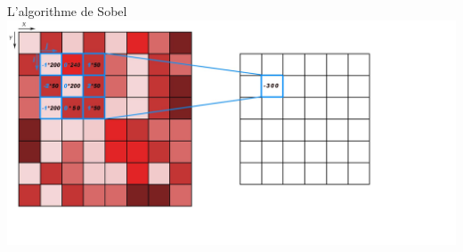 \documentclass[ignorenonframetext,]{beamer}
\begin{document}
\begin{frame}{L'algorithme de Sobel}
	\includegraphics{conv.jpeg}
\end{frame}
\end{document}
